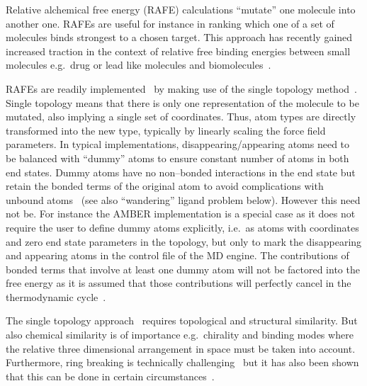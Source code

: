 \documentclass[journal=jctcce,manuscript=article]{achemso}
\begin{document}
Relative alchemical free energy (RAFE) calculations ``mutate'' one
molecule into another one.  RAFEs are useful for instance in ranking which one 
of a set of molecules binds strongest to a chosen target.  This approach has 
recently gained increased traction in the context of relative free binding 
energies between small molecules e.g.\ drug or lead like molecules and 
biomolecules~\cite{doi:10.1021/ja512751q, 
doi:10.1021/acs.jctc.6b00991}.

RAFEs are readily implemented~\cite{doi:10.1021/j100056a020, Michel2010} by 
making use of the single topology method~\cite{doi:10.1063/1.449208,
doi:10.1021/j100056a020, doi:10.1021/jp981628n}.  Single topology means that 
there is only one representation of the molecule to be mutated, also implying a 
single set of coordinates.
Thus, atom types are directly transformed into the new type,
typically by linearly scaling the force field parameters.
In typical implementations, disappearing/appearing atoms need to be balanced 
with ``dummy'' atoms to ensure 
constant number of atoms in both end states.  Dummy atoms have no non--bonded 
interactions in the end state but retain the bonded terms of the original atom 
to avoid complications with unbound atoms~\cite{doi:10.1021/jp981628n} (see 
also ``wandering'' ligand problem below).  However this need not be. 
For instance the AMBER implementation 
is a special case as it does not require the user to define dummy atoms 
explicitly, i.e.\ as atoms with coordinates and zero end state parameters in 
the topology, but only 
to mark the disappearing and appearing atoms in the control file of the 
MD engine.  The contributions of bonded terms that involve at least one 
dummy atom will not be factored into the free energy as it is assumed that 
those contributions will perfectly cancel in the thermodynamic 
cycle~\cite{doi:10.1021/acs.jcim.5b00057, doi:10.1021/jp994193s}.

The single topology approach~\cite{doi:10.1021/j100056a020} requires
topological and structural similarity.
But also chemical similarity is of importance e.g.\ chirality and binding modes 
where the relative three dimensional arrangement in space must be taken into 
account.  Furthermore, ring breaking is technically
challenging~\cite{doi:10.1021/acs.jctc.6b00991} but it has also been
shown that this can be done in certain 
circumstances~\cite{doi:10.1021/acs.jcim.5b00057,
  doi:10.1021/jp994193s}.
\end{document}
